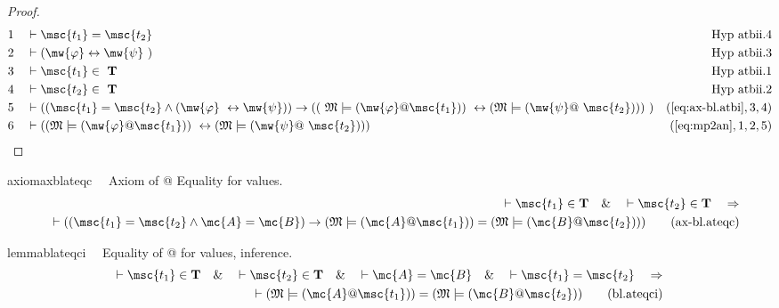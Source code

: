\begin{proof}
\begin{align}
  1 &&  & \vdash \msc{t_1} = \msc{t_2}&\text{Hyp~atbii.4}\notag%
  \\ 2 &&  & \vdash ( \mw{\varphi} \leftrightarrow \mw{\psi}
     ~)&\text{Hyp~atbii.3}\notag%
  \\ 3 &&  & \vdash \msc{t_1} \in
     ~\mathbf{T}&\text{Hyp~atbii.1}\notag%
  \\ 4 &&  & \vdash \msc{t_2} \in
     ~\mathbf{T}&\text{Hyp~atbii.2}\notag%
  \\ 5 &&  & \vdash ( ( \msc{t_1} = \msc{t_2} \wedge ( \mw{\varphi}
     ~\leftrightarrow \mw{\psi} ) ) \rightarrow ( (
     ~\mathfrak{M} \models ( \mw{\varphi} @ \msc{t_1} ) )
     ~\leftrightarrow ( \mathfrak{M} \models ( \mw{\psi} @
     ~\msc{t_2} ) ) )
     ~)&(\mbox{\ref{eq:ax-bl.atbi}},3,4)\notag
  \\ 6 &&  & \vdash ( ( \mathfrak{M} \models ( \mw{\varphi} @ \msc{t_1} ) )
     ~\leftrightarrow ( \mathfrak{M} \models ( \mw{\psi} @
     ~\msc{t_2} ) ) )&(\mbox{\ref{eq:mp2an}},1,2,5)\notag
\end{align}
\end{proof}

\begin{restatable}{axiom}{axblateqc}~~ Axiom of @ Equality for values.
\begin{align}
\vdash \msc{t_1} \in \mathbf{T}\quad\&\quad \vdash \msc{t_2} \in
    \mathbf{T}\quad\Rightarrow \notag \\ 
	\quad \vdash ( ( \msc{t_1} = \msc{t_2} \wedge
    \mc{A} = \mc{B} ) \rightarrow ( \mathfrak{M} \models ( \mc{A} @ \msc{t_1} )
    ) = ( \mathfrak{M} \models ( \mc{B} @ \msc{t_2} ) )
    )\label{eq:ax-bl.ateqc}\tag{ax-bl.ateqc}
\end{align}
\end{restatable}

\begin{restatable}{lemma}{blateqci}~~ Equality of @ for values, inference.
\begin{align}
\vdash \msc{t_1} \in \mathbf{T}\quad\&\quad \vdash \msc{t_2} \in
    \mathbf{T}\quad\&\quad \vdash \mc{A} = \mc{B}\quad\&\quad \vdash \msc{t_1}
    = \msc{t_2}\quad\Rightarrow \notag \\ 
	\quad \vdash ( \mathfrak{M} \models ( \mc{A} @
    \msc{t_1} ) ) = ( \mathfrak{M} \models ( \mc{B} @ \msc{t_2} )
    )\label{eq:bl.ateqci}\tag{bl.ateqci}
\end{align}
\end{restatable}

